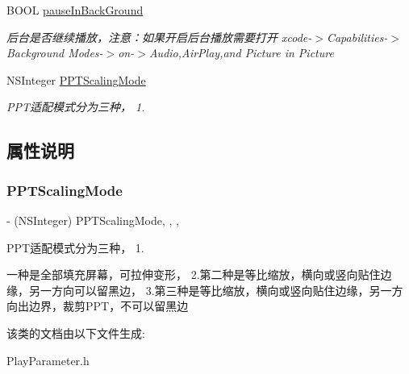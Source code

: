 \begin{DoxyCompactItemize}
B\+O\+OL \hyperlink{interface_play_parameter_a1044bc3b8162768a634f63d11689c6f9}{pause\+In\+Back\+Ground}
\begin{DoxyCompactList}\small\item\em 后台是否继续播放，注意：如果开启后台播放需要打开 xcode-\/$>$Capabilities-\/$>$Background Modes-\/$>$on-\/$>$Audio,Air\+Play,and Picture in Picture \end{DoxyCompactList}\item 
N\+S\+Integer \hyperlink{interface_play_parameter_a515289628340de9b9e482191a48393e5}{P\+P\+T\+Scaling\+Mode}
\begin{DoxyCompactList}\small\item\em P\+P\+T适配模式分为三种， 1. \end{DoxyCompactList}\end{DoxyCompactItemize}


\subsection{属性说明}
\mbox{\label{interface_play_parameter_a515289628340de9b9e482191a48393e5}} 
\subsubsection{\texorpdfstring{P\+P\+T\+Scaling\+Mode}{PPTScalingMode}}
{\footnotesize\ttfamily -\/ (N\+S\+Integer) P\+P\+T\+Scaling\+Mode\hspace{0.3cm}{\ttfamily [read]}, {\ttfamily [write]}, {\ttfamily [nonatomic]}, {\ttfamily [assign]}}



P\+P\+T适配模式分为三种， 1. 

一种是全部填充屏幕，可拉伸变形， 2.第二种是等比缩放，横向或竖向贴住边缘，另一方向可以留黑边， 3.第三种是等比缩放，横向或竖向贴住边缘，另一方向出边界，裁剪\+P\+P\+T，不可以留黑边 

该类的文档由以下文件生成\+:\begin{DoxyCompactItemize}
\item 
Play\+Parameter.\+h\end{DoxyCompactItemize}
